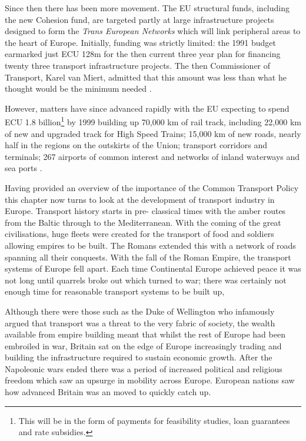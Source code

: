 Since then there has been more movement. The EU structural funds, including the new Cohesion fund, are targeted partly at large infrastructure projects designed to form the \textit{Trans European Networks} which will link peripheral areas to the heart of Europe. Initially, funding was strictly limited: the 1991 budget earmarked just ECU 128m for the then current three year plan for financing twenty three transport infrastructure projects. The then Commissioner of Transport, Karel van Miert, admitted that this amount was less than what he thought would be the minimum needed \cite{EC:1992}.

However, matters have since advanced rapidly with the EU expecting to spend ECU 1.8 billion\footnote{This will be in the form of payments for feasibility studies, loan guarantees and rate subsidies.} by 1999 building up 70,000 km of rail track, including 22,000 km of new and upgraded track for High Speed Trains; 15,000 km of new roads, nearly half in the regions on the outskirts of the Union; transport corridors and terminals; 267 airports of common interest and networks of inland waterways and sea ports \cite{EU:1997}.

Having provided an overview of the importance of the Common Transport Policy this chapter now turns to look at the development of transport industry in Europe. Transport history starts in pre- classical times with the amber routes from the Baltic through to the Mediterranean. With the coming of the great civilisations, huge fleets were created for the transport of food and soldiers allowing empires to be built. The Romans extended this with a network of roads spanning all their conquests. With the fall of the Roman Empire, the transport systems of Europe fell apart. Each time Continental Europe achieved peace it was not long until quarrels broke out which turned to war; there was certainly not enough time for reasonable transport systems to be built up,

Although there were those such as the Duke of Wellington who infamously argued that transport was a threat to the very fabric of society, the wealth available from empire building meant that whilst the rest of Europe had been embroiled in war, Britain sat on the edge of Europe increasingly trading and building the infrastructure required to sustain economic growth. After the Napoleonic wars ended there was a period of increased political and religious freedom which saw an upsurge in mobility across Europe. European nations saw how advanced Britain was an moved to quickly catch up.

